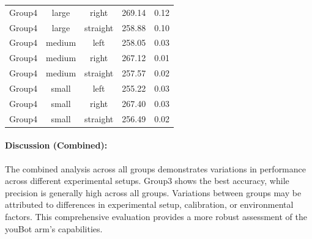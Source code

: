 \begin{table}[H]
\begin{tabular}{|c|c|c|c|c|}
Group4 & large & right & 269.14 & 0.12 \\
Group4 & large & straight & 258.88 & 0.10 \\
Group4 & medium & left & 258.05 & 0.03 \\
Group4 & medium & right & 267.12 & 0.01 \\
Group4 & medium & straight & 257.57 & 0.02 \\
Group4 & small & left & 255.22 & 0.03 \\
Group4 & small & right & 267.40 & 0.03 \\
Group4 & small & straight & 256.49 & 0.02 \\
\hline
\end{tabular}
\end{table}




\paragraph{Discussion (Combined):}
The combined analysis across all groups demonstrates variations in performance across different experimental setups. Group3 shows the best accuracy, while precision is generally high across all groups. Variations between groups may be attributed to differences in experimental setup, calibration, or environmental factors. This comprehensive evaluation provides a more robust assessment of the youBot arm's capabilities.

